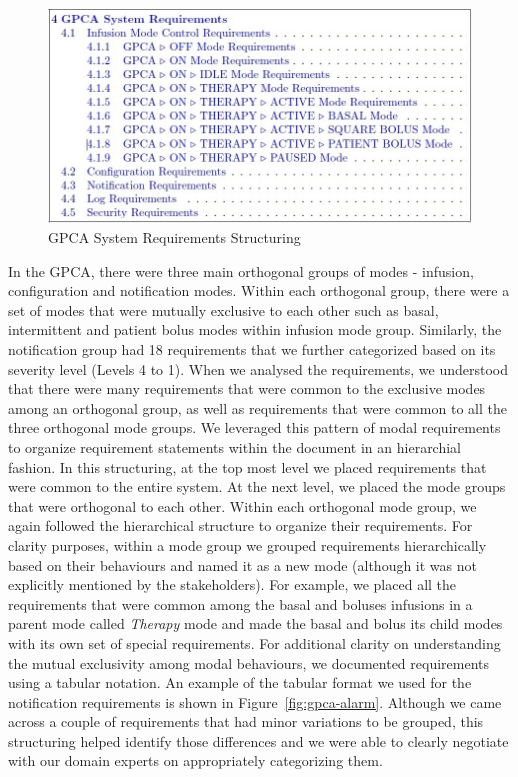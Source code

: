  \begin{figure}[h!]
    \centering
    \includegraphics[width=\columnwidth]{images/structuring.jpg}
    \caption{GPCA System Requirements Structuring}
    \label{fig:gpca-requirements}
 \end{figure}

In the GPCA, there were three main orthogonal groups of modes - infusion, configuration and notification modes. Within each orthogonal group, there were a set of modes that were mutually exclusive to each other such as basal, intermittent and patient bolus modes within infusion mode group. Similarly, the notification group had 18 requirements that we further categorized based on its severity level (Levels 4 to 1). When we analysed the requirements, we understood that there were many requirements that were common to the exclusive modes among an orthogonal group, as well as requirements that were common to all the three orthogonal mode groups. We leveraged this pattern of modal requirements to organize requirement statements within the document in an hierarchial fashion. In this structuring, at the top most level we placed requirements that were common to the entire system. At the next level, we placed the mode groups that were orthogonal to each other. Within each orthogonal mode group, we again followed the hierarchical structure to organize their requirements. For clarity purposes, within a mode group we grouped requirements hierarchically based on their behaviours and named it as a new mode (although it was not explicitly mentioned by the stakeholders). For example, we placed all the requirements that were common among the basal and boluses infusions in a parent mode called \emph{Therapy} mode and made the basal and bolus its child modes with its own set of special requirements. For additional clarity on understanding the mutual exclusivity among modal behaviours, we documented requirements using a tabular notation. An example of the tabular format we used for the notification requirements is shown in Figure~\ref{fig:gpca-alarm}. Although we came across a couple of requirements that had minor variations to be grouped, this structuring helped identify those differences and we were able to clearly negotiate with our domain experts on appropriately categorizing them.

